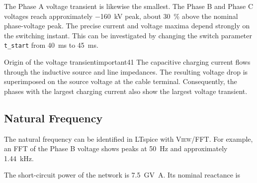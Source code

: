 The Phase A voltage transient is likewise the smallest. The Phase B and
Phase C voltages reach approximately \SI{-160}{\kilo\volt} peak, about
\SI{30}{\percent} above the nominal phase-voltage peak. The precise current
and voltage maxima depend strongly on the switching instant. This can be
investigated by changing the switch parameter \texttt{t\_start} from
\SI{40}{\milli\second} to \SI{45}{\milli\second}.

\begin{important}{Origin of the voltage transient}{important41}
The capacitive charging current flows through the inductive source and line
impedances. The resulting voltage drop is superimposed on the source voltage
at the cable terminal. Consequently, the phases with the largest charging
current also show the largest voltage transient.
\end{important}

\subsection{Natural Frequency}
\label{sec:unloaded-line-natural-frequency}

The natural frequency can be identified in LTspice with
\textsc{View}/\textsc{FFT}. For example, an FFT of the Phase B voltage 
shows peaks at \SI{50}{\hertz} and approximately
\SI{1.44}{\kilo\hertz}.

The short-circuit power of the network is \SI{7.5}{\giga\volt\ampere}. Its
nominal reactance is


